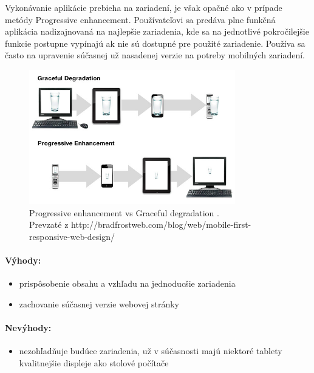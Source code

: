 Vykonávanie aplikácie prebieha na zariadení, je však opačné ako v prípade metódy Progressive enhancement. Používateľovi sa predáva plne funkčná aplikácia nadizajnovaná na najlepšie zariadenia, kde sa na jednotlivé pokročilejšie funkcie postupne vypínajú ak nie sú dostupné pre použité zariadenie. Používa sa často na upravenie súčasnej už nasadenej verzie na potreby mobilných zariadení.

\begin{figure}[H]
	\centering
	\includegraphics[width=0.8\textwidth]{img/PEvsGD.jpg}
	\caption[Progressive enhancement vs Graceful degradation]{
		Progressive enhancement vs Graceful degradation \cite{adaptivesxsw}.\\
		Prevzaté z http://bradfrostweb.com/blog/web/mobile-first-responsive-web-design/}
	\label{fig: gd}
\end{figure}

\paragraph{Výhody:}
\begin{itemize}
	\item prispôsobenie obsahu a vzhľadu na jednoducšie zariadenia
	\item zachovanie súčasnej verzie webovej stránky
\end{itemize}

\paragraph{Nevýhody:}
\begin{itemize}
	\item nezohľadňuje budúce zariadenia, už v súčasnosti majú niektoré tablety kvalitnejšie displeje ako stolové počítače 
\end{itemize}

